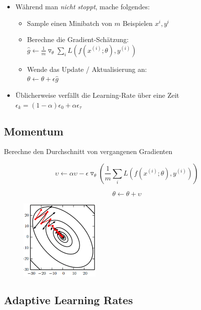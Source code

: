 \documentclass[a4paper]{article}
\begin{document}
		\begin{itemize}
			\item Während man \textit{nicht stoppt}, mache folgendes:
				\begin{itemize}
					\item Sample einen Minibatch von $m$ Beispielen $x^i, y^i$
					\item Berechne die Gradient-Schätzung: \\
					$\hat{g} \leftarrow \frac{1}{m} \triangledown_\theta \sum_{i} L( f ( x^{(i)}; \theta ) , y^{(i)} )$ \\
					\item Wende das Update / Aktualisierung an: \\
					$ \theta \leftarrow \theta + \epsilon \hat{g} $ \\
				\end{itemize}
			\item Üblicherweise verfällt die Learning-Rate über eine Zeit \\
			$ \epsilon_{k} = ( 1 - \alpha ) \epsilon_{0} + \alpha \epsilon_{\tau} $
		\end{itemize}
	
		\subsection{Momentum}
		
		Berechne den Durchschnitt von vergangenen Gradienten
		
		$$ \upsilon \leftarrow \alpha \upsilon - \epsilon \triangledown_\theta (\frac{1}{m} \sum_{i} L ( f ( x^{(i)}; \theta ), y^{(i)} ) )$$
		
		$$ \theta \leftarrow \theta + \upsilon $$
	
		\begin{figure}[htb!]
			\centering
			\includegraphics[width=0.35\textwidth]{img/06_deep_nn/momentum.png}
		\end{figure}
	
		\newpage
		
		\subsection{Adaptive Learning Rates}
	
\end{document}
